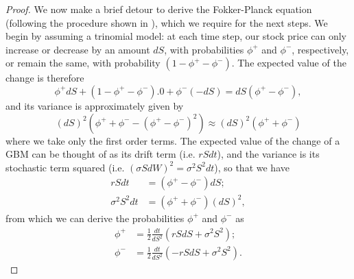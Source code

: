 \begin{proof}
We now make a brief detour to derive the Fokker-Planck equation (following the procedure shown in \cite{Wilmott}), which we require for the next steps.
We begin by assuming a trinomial model: at each time step, our stock price can only increase or decrease by an amount $dS$, with probabilities $\phi^+$ and $\phi^-$, respectively, or remain the same, with probability $(1-\phi^+-\phi^-)$.
The expected value of the change is therefore
\begin{equation}
\phi^+dS+(1-\phi^+-\phi^-).0+\phi^-(-dS)=dS(\phi^+-\phi^-),
\end{equation}
\noindent and its variance is approximately given by
\begin{equation}
(dS)^2(\phi^++\phi^--(\phi^+-\phi^-)^2)\approx (dS)^2(\phi^++\phi^-)
\end{equation}
\noindent where we take only the first order terms. The expected value of the change of a GBM can be thought of as its drift term (i.e. $rSdt$), and the variance is its stochastic term squared (i.e. $(\sigma SdW)^2=\sigma^2S^2dt$), so that we have
\begin{equation}
\begin{split}
rSdt&=(\phi^+-\phi^-)dS;\\
\sigma^2S^2dt&=(\phi^++\phi^-)(dS)^2,
\end{split}
\end{equation}
\noindent from which we can derive the probabilities $\phi^+$ and $\phi^-$ as
\begin{equation}
\begin{split}
\phi^+&=\frac{1}{2}\frac{dt}{dS^2}(rSdS+\sigma^2S^2);\\
\phi^-&=\frac{1}{2}\frac{dt}{dS^2}(-rSdS+\sigma^2S^2).
\end{split}
\end{equation}


\end{proof}
